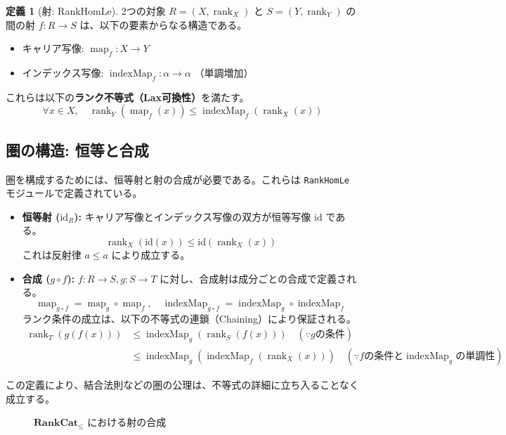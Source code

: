 \documentclass[a4paper,11pt]{article}
\theoremstyle{definition}
\newtheorem{definition}{定義}[section]
\theoremstyle{plain}
\newcommand{\code}[1]{\texttt{#1}}
\newcommand{\rank}{\operatorname{rank}}
\newcommand{\map}{\operatorname{map}}
\newcommand{\indexMap}{\operatorname{indexMap}}
\newcommand{\id}{\mathrm{id}}
\newcommand{\RankCatLe}{\mathbf{RankCat}_{\le}}
\begin{document}
\begin{definition}[射: RankHomLe]
2つの対象 $R=(X, \rank_X)$ と $S=(Y, \rank_Y)$ の間の射 $f: R \to S$ は、以下の要素からなる構造である。
\begin{itemize}
    \item キャリア写像: $\map_f : X \to Y$
    \item インデックス写像: $\indexMap_f : \alpha \to \alpha$ （単調増加）
\end{itemize}
これらは以下の\textbf{ランク不等式（Lax可換性）}を満たす。
\[
  \forall x \in X,\quad \rank_Y(\map_f(x)) \le \indexMap_f(\rank_X(x))
\]
\end{definition}

\subsection{圏の構造: 恒等と合成}

圏を構成するためには、恒等射と射の合成が必要である。これらは \code{RankHomLe} モジュールで定義されている。

\begin{itemize}
    \item \textbf{恒等射 ($\id_R$):}
    キャリア写像とインデックス写像の双方が恒等写像 $\id$ である。
    \[ \rank_X(\id(x)) \le \id(\rank_X(x)) \]
    これは反射律 $a \le a$ により成立する。

    \item \textbf{合成 ($g \circ f$):}
    $f: R \to S, g: S \to T$ に対し、合成射は成分ごとの合成で定義される。
    \[ \map_{g \circ f} = \map_g \circ \map_f, \quad \indexMap_{g \circ f} = \indexMap_g \circ \indexMap_f \]
    ランク条件の成立は、以下の不等式の連鎖（Chaining）により保証される。
    \begin{align*}
        \rank_T(g(f(x))) 
        &\le \indexMap_g(\rank_S(f(x))) \quad (\because g \text{の条件}) \\
        &\le \indexMap_g(\indexMap_f(\rank_X(x))) \quad (\because f \text{の条件と} \indexMap_g \text{の単調性})
    \end{align*}
\end{itemize}

この定義により、結合法則などの圏の公理は、不等式の詳細に立ち入ることなく成立する。

\begin{figure}[h]
\centering
{}
\caption{$\RankCatLe$ における射の合成}
\end{figure}
\end{document}
